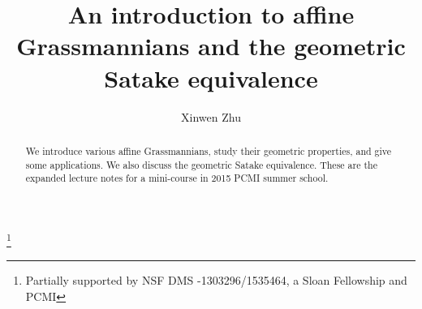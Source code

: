 \documentclass[]{pcmi}
\theoremstyle{plain}
\theoremstyle{remark}
\theoremstyle{definition}
\begin{document}
%
%
%
%
%
%

\title{An introduction to affine Grassmannians and the geometric Satake equivalence}

%    
%    
\author{Xinwen Zhu} \thanks{Partially supported by NSF DMS -1303296/1535464, a Sloan Fellowship and PCMI} 
\address{Department of Mathematics, California Institute of Technology, Pasadena, CA 91125}

%    
%    
\begin{abstract}
We introduce various affine Grassmannians, study their geometric properties, and give some applications. We also discuss the geometric Satake equivalence.
These are the expanded lecture notes for a mini-course in 2015 PCMI summer school.  
\end{abstract}


%    
%    
\maketitle

%    
%    
\end{document}
